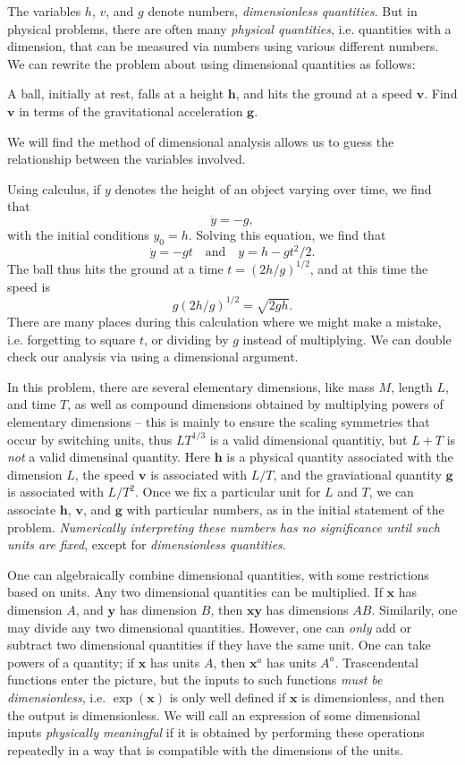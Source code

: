 The variables $h$, $v$, and $g$ denote numbers, \emph{dimensionless quantities}. But in physical problems, there are often many \emph{physical quantities}, i.e. quantities with a dimension, that can be measured via numbers using various different numbers. We can rewrite the problem about using dimensional quantities as follows:

\begin{displayquote}
    A ball, initially at rest, falls at a height $\mathbf{h}$, and hits the ground at a speed $\mathbf{v}$. Find $\mathbf{v}$ in terms of the gravitational acceleration $\mathbf{g}$.
\end{displayquote}
%
We will find the method of dimensional analysis allows us to guess the relationship between the variables involved.

Using calculus, if $y$ denotes the height of an object varying over time, we find that
%
\[ \ddot{y} = -g, \]
%
with the initial conditions $y_0 = h$. Solving this equation, we find that
%
\[ \dot{y} = -gt \quad\text{and}\quad y = h - gt^2/2. \]
%
The ball thus hits the ground at a time $t = (2h/g)^{1/2}$, and at this time the speed is
%
\[ g(2h/g)^{1/2} = \sqrt{2gh}. \]
%
There are many places during this calculation where we might make a mistake, i.e. forgetting to square $t$, or dividing by $g$ instead of multiplying. We can double check our analysis via using a dimensional argument.

In this problem, there are several elementary dimensions, like mass $M$, length $L$, and time $T$, as well as compound dimensions obtained by multiplying powers of elementary dimensions -- this is mainly to ensure the scaling symmetries that occur by switching units, thus $LT^{1/3}$ is a valid dimensional quantitiy, but $L + T$ is \emph{not} a valid dimensinal quantity. Here $\mathbf{h}$ is a physical quantity associated with the dimension $L$, the speed $\mathbf{v}$ is associated with $L/T$, and the graviational quantity $\mathbf{g}$ is associated with $L/T^2$. Once we fix a particular unit for $L$ and $T$, we can associate $\mathbf{h}$, $\mathbf{v}$, and $\mathbf{g}$ with particular numbers, as in the initial statement of the problem. \emph{Numerically interpreting these numbers has no significance until such units are fixed}, except for \emph{dimensionless quantities}.

One can algebraically combine dimensional quantities, with some restrictions based on units. Any two dimensional quantities can be multiplied. If $\mathbf{x}$ has dimension $A$, and $\mathbf{y}$ has dimension $B$, then $\mathbf{x} \mathbf{y}$ has dimensions $AB$. Similarily, one may divide any two dimensional quantities. However, one can \emph{only} add or subtract two dimensional quantities if they have the same unit. One can take powers of a quantity; if $\mathbf{x}$ has units $A$, then $\mathbf{x}^a$ has units $A^a$. Trascendental functions enter the picture, but the inputs to such functions \emph{must be dimensionless}, i.e. $\exp(\mathbf{x})$ is only well defined if $\mathbf{x}$ is dimensionless, and then the output is dimensionless. We will call an expression of some dimensional inputs \emph{physically meaningful} if it is obtained by performing these operations repeatedly in a way that is compatible with the dimensions of the units.

